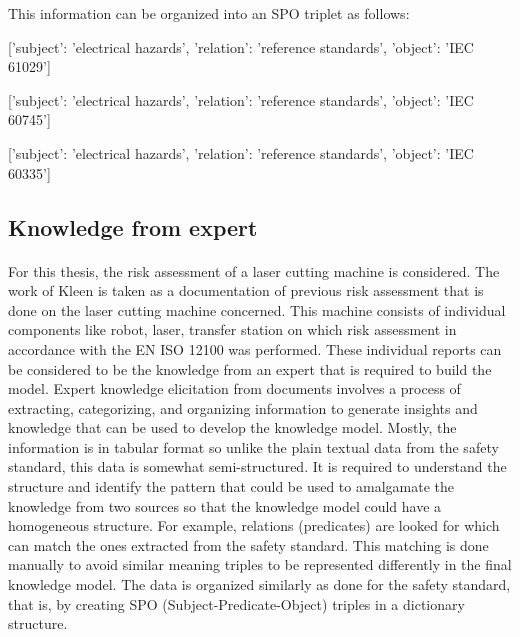 This information can be organized into an SPO triplet as follows:

[{'subject': 'electrical hazards', 'relation': 'reference standards', 'object': 'IEC 61029'}]

[{'subject': 'electrical hazards', 'relation': 'reference standards', 'object': 'IEC 60745'}]

[{'subject': 'electrical hazards', 'relation': 'reference standards', 'object': 'IEC 60335'}]

\subsection{Knowledge from expert}


\bigskip {}

\paragraph{} For this thesis, the risk assessment of a laser cutting machine is considered. The work of Kleen \cite{kleen} is taken as a documentation of previous risk assessment that is done on the laser cutting machine concerned. This machine consists of individual components like robot, laser, transfer station on which risk assessment in accordance with the EN ISO 12100 was performed. These individual reports can be considered to be the knowledge from an expert that is required to build the model. Expert knowledge elicitation from documents involves a process of extracting, categorizing, and organizing information to generate insights and knowledge that can be used to develop the knowledge model. Mostly, the information is in tabular format so unlike the plain textual data from the safety standard, this data is somewhat semi-structured. It is required to understand the structure and identify the pattern that could be used to amalgamate the knowledge from two sources so that the knowledge model could have a homogeneous structure. For example, relations (predicates) are looked for which can match the ones extracted from the safety standard. This matching is done manually to avoid similar meaning triples to be represented differently in the final knowledge model. The data is organized similarly as done for the safety standard, that is, by creating SPO (Subject-Predicate-Object) triples in a dictionary structure. 

